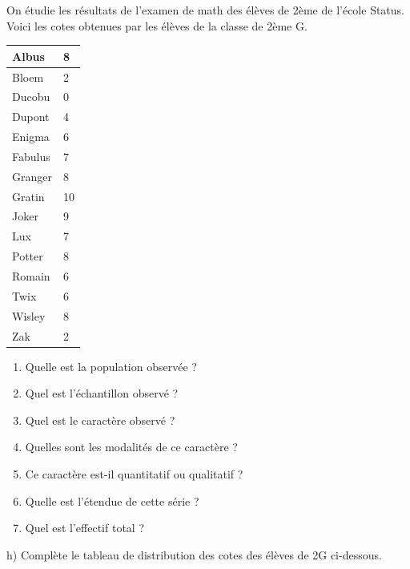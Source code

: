 \documentclass[../math2.tex]{subfiles}
\begin{document}
\newpage
\begin{exercise}
    On étudie les résultats de l’examen de math des élèves de 2ème de l’école Status. \\
    Voici les cotes obtenues par les élèves de la classe de 2ème G. \\

    {\renewcommand{\arraystretch}{1}
  \begin{tabularx}{\textwidth}{|Y|Y|}
      \hline
       Albus & 8 \\
      \hline
       Bloem & 2 \\
      \hline
       Ducobu & 0 \\
      \hline
       Dupont & 4 \\
      \hline
       Enigma & 6 \\
      \hline
       Fabulus & 7 \\
      \hline
       Granger & 8 \\
      \hline
       Gratin & 10 \\
      \hline
       Joker & 9 \\
      \hline
       Lux & 7 \\
      \hline
       Potter & 8 \\
      \hline
       Romain & 6 \\
      \hline
       Twix & 6 \\
      \hline
       Wisley & 8 \\
      \hline
       Zak & 2 \\
      \hline
  \end{tabularx}}

  \vspace{1cm}
\begin{enumerate}[cols = 2, itemsep = 2cm]
    \item Quelle est la population observée ?
   \item Quel est l’échantillon observé ?
   \item Quel est le caractère observé ?
   \item Quelles sont les modalités de ce caractère ?
   \item Ce caractère est-il quantitatif ou qualitatif ?
   \item Quelle est l’étendue de cette série ?
   \item Quel est l’effectif total ?
   \end{enumerate}
   \newpage

   h)  Complète le tableau de distribution des cotes des élèves de 2G ci-dessous. \\
   

\end{exercise}
\end{document}
